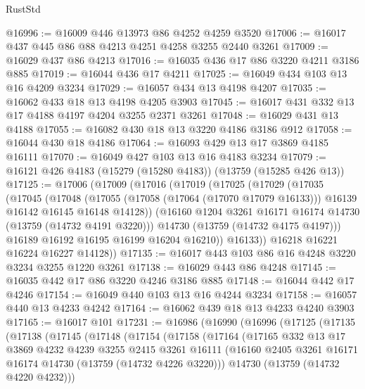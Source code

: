 \begin{lexlean}{RustStd}
\begin{coremodule}
@16996 := @16009 @446 @13973 @86 @4252 @4259 @3520
@17006 := @16017 @437 @445 @86 @88 @4213 @4251 @4258 @3255 @2440 @3261
@17009 := @16029 @437 @86 @4213
@17016 := @16035 @436 @17 @86 @3220 @4211 @3186 @885
@17019 := @16044 @436 @17 @4211
@17025 := @16049 @434 @103 @13 @16 @4209 @3234
@17029 := @16057 @434 @13 @4198 @4207
@17035 := @16062 @433 @18 @13 @4198 @4205 @3903
@17045 := @16017 @431 @332 @13 @17 @4188 @4197 @4204 @3255 @2371 @3261
@17048 := @16029 @431 @13 @4188
@17055 := @16082 @430 @18 @13 @3220 @4186 @3186 @912
@17058 := @16044 @430 @18 @4186
@17064 := @16093 @429 @13 @17 @3869 @4185 @16111
@17070 := @16049 @427 @103 @13 @16 @4183 @3234
@17079 := @16121 @426 @4183 (@15279 (@15280 @4183)) (@13759 (@15285 @426 @13))
@17125 := @17006
    (@17009
      (@17016
        (@17019
          (@17025
            (@17029
              (@17035
                (@17045
                  (@17048
                    (@17055
                      (@17058 (@17064 (@17070 @17079 @16133)))
                      @16139
                      @16142
                      @16145
                      @16148
                      @14128))
                  (@16160 @1204 @3261 @16171 @16174 @14730 (@13759 (@14732 @4191 @3220)))
                  @14730
                  (@13759 (@14732 @4175 @4197)))
                @16189
                @16192
                @16195
                @16199
                @16204
                @16210))
            @16133))
        @16218
        @16221
        @16224
        @16227
        @14128))
@17135 := @16017 @443 @103 @86 @16 @4248 @3220 @3234 @3255 @1220 @3261
@17138 := @16029 @443 @86 @4248
@17145 := @16035 @442 @17 @86 @3220 @4246 @3186 @885
@17148 := @16044 @442 @17 @4246
@17154 := @16049 @440 @103 @13 @16 @4244 @3234
@17158 := @16057 @440 @13 @4233 @4242
@17164 := @16062 @439 @18 @13 @4233 @4240 @3903
@17165 := @16017 @101
@17231 := @16986
    (@16990
      (@16996
        (@17125
          (@17135
            (@17138
              (@17145
                (@17148
                  (@17154
                    (@17158
                      (@17164
                        (@17165
                          @332
                          @13
                          @17
                          @3869
                          @4232
                          @4239
                          @3255
                          @2415
                          @3261
                          @16111
                          (@16160 @2405 @3261 @16171 @16174 @14730 (@13759 (@14732 @4226 @3220)))
                          @14730
                          (@13759 (@14732 @4220 @4232)))

\end{coremodule}
\end{lexlean}
